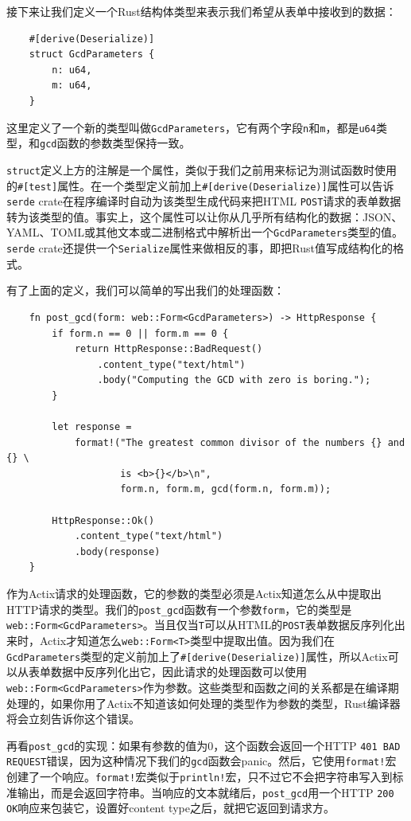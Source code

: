 接下来让我们定义一个Rust结构体类型来表示我们希望从表单中接收到的数据：
\begin{verbatim}
    #[derive(Deserialize)]
    struct GcdParameters {
        n: u64,
        m: u64,
    }
\end{verbatim}

这里定义了一个新的类型叫做\texttt{GcdParameters}，它有两个字段\texttt{n}和\texttt{m}，都是\texttt{u64}类型，和\texttt{gcd}函数的参数类型保持一致。

\texttt{struct}定义上方的注解是一个属性，类似于我们之前用来标记为测试函数时使用的\texttt{\#[test]}属性。在一个类型定义前加上\texttt{\#[derive(Deserialize)]}属性可以告诉\texttt{serde} crate在程序编译时自动为该类型生成代码来把HTML \texttt{POST}请求的表单数据转为该类型的值。事实上，这个属性可以让你从几乎所有结构化的数据：JSON、YAML、TOML或其他文本或二进制格式中解析出一个\texttt{GcdParameters}类型的值。\texttt{serde} crate还提供一个\texttt{Serialize}属性来做相反的事，即把Rust值写成结构化的格式。

有了上面的定义，我们可以简单的写出我们的处理函数：
\begin{verbatim}
    fn post_gcd(form: web::Form<GcdParameters>) -> HttpResponse {
        if form.n == 0 || form.m == 0 {
            return HttpResponse::BadRequest()
                .content_type("text/html")
                .body("Computing the GCD with zero is boring.");
        }

        let response = 
            format!("The greatest common divisor of the numbers {} and {} \
                    is <b>{}</b>\n",
                    form.n, form.m, gcd(form.n, form.m));
        
        HttpResponse::Ok()
            .content_type("text/html")
            .body(response)
    }
\end{verbatim}

作为Actix请求的处理函数，它的参数的类型必须是Actix知道怎么从中提取出HTTP请求的类型。我们的\texttt{post\_gcd}函数有一个参数\texttt{form}，它的类型是\texttt{web::Form<GcdParameters>}。当且仅当\texttt{T}可以从HTML的\texttt{POST}表单数据反序列化出来时，Actix才知道怎么\texttt{web::Form<T>}类型中提取出值。因为我们在\texttt{GcdParameters}类型的定义前加上了\texttt{\#[derive(Deserialize)]}属性，所以Actix可以从表单数据中反序列化出它，因此请求的处理函数可以使用\texttt{web::Form<GcdParameters>}作为参数。这些类型和函数之间的关系都是在编译期处理的，如果你用了Actix不知道该如何处理的类型作为参数的类型，Rust编译器将会立刻告诉你这个错误。

再看\texttt{post\_gcd}的实现：如果有参数的值为0，这个函数会返回一个HTTP \texttt{401 BAD REQUEST}错误，因为这种情况下我们的\texttt{gcd}函数会panic。然后，它使用\texttt{format!}宏创建了一个响应。\texttt{format!}宏类似于\texttt{println!}宏，只不过它不会把字符串写入到标准输出，而是会返回字符串。当响应的文本就绪后，\texttt{post\_gcd}用一个HTTP \texttt{200 OK}响应来包装它，设置好content type之后，就把它返回到请求方。

